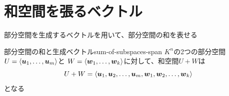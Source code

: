 \documentclass[../../../topic_linear-algebra]{subfiles}
\begin{document}
\sectionline
\section{和空間を張るベクトル}

\begin{mindflow}
\end{mindflow}

部分空間を生成するベクトルを用いて、部分空間の和を表せる

\begin{theorem}{部分空間の和と生成ベクトル}{sum-of-subspaces-span}
  $K^n$の2つの部分空間$U = \langle \vb*{u}_1, \dots, \vb*{u}_m \rangle$と
  $W = \langle \vb*{w}_1, \dots, \vb*{w}_k \rangle$に対して、和空間$U + W$は
  \begin{equation*}
    U + W = \langle \vb*{u}_1, \vb*{u}_2, \dots, \vb*{u}_m, \vb*{w}_1, \vb*{w}_2, \dots, \vb*{w}_k \rangle
  \end{equation*}
  となる
\end{theorem}
\end{document}
